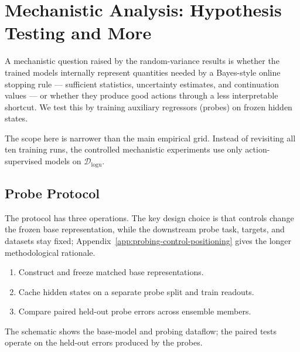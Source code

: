 \documentclass[11pt]{article}
\begin{document}
\newpage
\section{Mechanistic Analysis: Hypothesis Testing and More}
\label{sec:probe}

A mechanistic question raised by the random-variance results is whether the trained models internally represent quantities needed by a Bayes-style online stopping rule --- sufficient statistics, uncertainty estimates, and continuation values --- or whether they produce good actions through a less interpretable shortcut. We test this by training auxiliary regressors (probes) on frozen hidden states.

The scope here is narrower than the main empirical grid. Instead of revisiting all ten training runs, the controlled mechanistic experiments use only action-supervised models on $\mathcal{D}_{\mathrm{logu}}$.

\subsection{Probe Protocol}
\label{sec:probe-protocol-overview}

The protocol has three operations. The key design choice is that controls change the frozen base representation, while the downstream probe task, targets, and datasets stay fixed; Appendix~\ref{app:probing-control-positioning} gives the longer methodological rationale.
\begin{enumerate}
\item Construct and freeze matched base representations.
\item Cache hidden states on a separate probe split and train readouts.
\item Compare paired held-out probe errors across ensemble members.
\end{enumerate}
The schematic shows the base-model and probing dataflow; the paired tests operate on the held-out errors produced by the probes.
\end{document}

